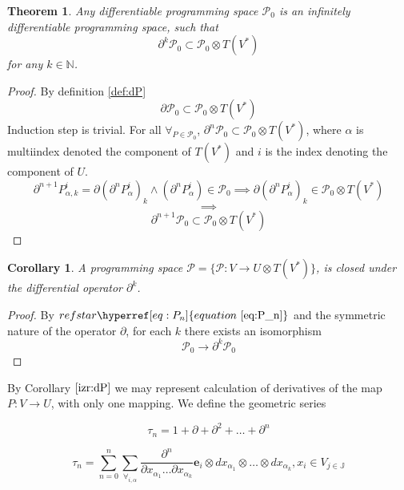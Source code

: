 \documentclass{article}
\makeatletter
\newcommand{\JJ}{\mathbb{J}}
\newcommand{\e}{\mathbf{e}}
\newcommand{\dP}{\mathcal{P}}
\newcommand{\D}{\partial}
\newcommand{\sumd}{\tau}
\newtheorem{izrek}{Theorem}[section]
\newtheorem{corollary}{Corollary}[section]
\let\originaleqref\eqref %
\renewcommand{\eqref}[1]{%
  \begingroup%
  \let\ref\@refstar%
  \hyperref[#1]{%
    equation%
    ~\originaleqref{#1}%
  }%
  \endgroup
}
\makeatother
\begin{document}
\begin{izrek}\label{izr:P}
	Any differentiable programming space $\dP_0$ is an
  infinitely differentiable programming space, such that
	\begin{equation}\label{eq:P_n}
	 		\D^k\dP_0\subset\dP_0\otimes T(V^*)
	 	\end{equation}
for any $k\in\mathbb{N}$.
\end{izrek}
\begin{proof} By definition \ref{def:dP}
$$\D\dP_0\subset\dP_0\otimes T(V^*)$$
	Induction step is trivial. For all 	$\forall_{P\in\dP_0}$,
  $\D^n\dP_0\subset\dP_0\otimes T(V^*)$, where
  $\alpha$ is multiindex denoted the component of $T(V^*)$ and $i$ is the
  index denoting the component of $U$.
	\begin{equation}\label{eq:inductionStep}
\D^{n+1}P_{\alpha,k}^i=\D(\D^n P^i_\alpha)_k\land(\D^n P^i_\alpha)\in\dP_0\implies \D(\D^n P^i_\alpha)_k\in \dP_0\otimes T(V^*)
	\end{equation}
	$$\implies$$
	$$\D^{n+1}\dP_0\subset\dP_0\otimes T(V^*)$$
\end{proof}

 \begin{corollary}\label{izr:dP}
	A programming space $\dP=\{\dP:V\to U\otimes T(V^*)\}$, is closed under the differential operator $\D^k$.
 \end{corollary}
 \begin{proof}
 	 By $\eqref{eq:P_n}$ and the symmetric nature of the operator $\D$, for each $k$ there exists an isomorphism
 	 	\begin{equation}
 	 		\dP_0\to\D^k\dP_0
 	 	\end{equation}
 \end{proof}

By Corollary $\ref{izr:dP}$ we may represent calculation of derivatives of the map $P:V\to U$, with only one mapping. We define the geometric series
 
 \begin{equation}\label{eq:DD}
  	\sumd_n = 1+\D +\D^2 +\ldots + \D^n 
  \end{equation}
  
  
  \begin{equation}
  	\sumd_n=\sum\limits_{n=0}^{n}\sum_{\forall_{i,\alpha}}\frac{\partial^n}{\partial
  		    x_{\alpha_1}\ldots \partial x_{\alpha_k}}\e_i\otimes
  		  dx_{\alpha_1}\otimes\ldots \otimes dx_{\alpha_k} , x_i\in V_{j\in\JJ}
  \end{equation}
  
\end{document}
